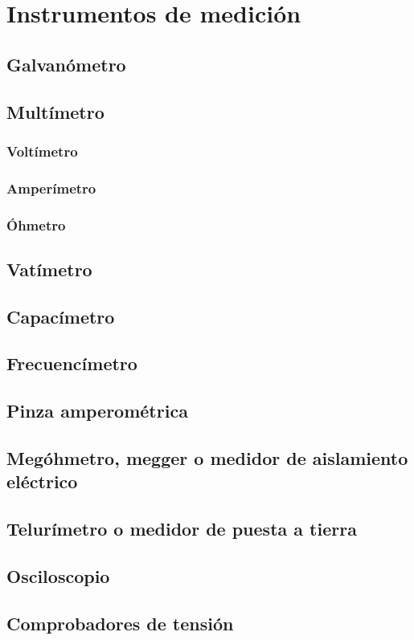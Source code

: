 \chapter{Instrumentos de medición}

\section{Galvanómetro}
\section{Multímetro}
\subsection{Voltímetro}
\subsection{Amperímetro}
\subsection{Óhmetro}
\section{Vatímetro}
\section{Capacímetro}
\section{Frecuencímetro}
\section{Pinza amperométrica}
\section{Megóhmetro, megger o medidor de aislamiento eléctrico}
\section{Telurímetro o medidor de puesta a tierra}
\section{Osciloscopio}
\section{Comprobadores de tensión}
